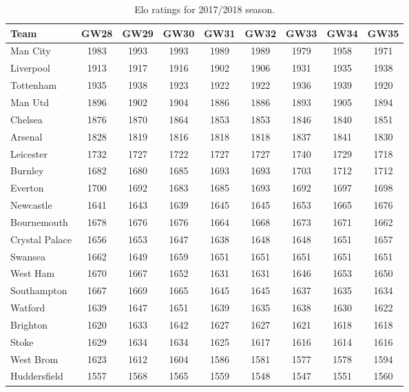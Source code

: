 \begin{table}[H]
\centering
\smaller
\begin{tabular}{|l|c|c|c|c|c|c|c|c|}
\hline
Team           & GW28 & GW29 & GW30 & GW31 & GW32 & GW33 & GW34 & GW35 \\
\hline
Man City       & 1983 & 1993 & 1993 & 1989 & 1989 & 1979 & 1958 & 1971 \\
Liverpool      & 1913 & 1917 & 1916 & 1902 & 1906 & 1931 & 1935 & 1938 \\
Tottenham      & 1935 & 1938 & 1923 & 1922 & 1922 & 1936 & 1939 & 1920 \\
Man Utd        & 1896 & 1902 & 1904 & 1886 & 1886 & 1893 & 1905 & 1894 \\
Chelsea        & 1876 & 1870 & 1864 & 1853 & 1853 & 1846 & 1840 & 1851 \\
Arsenal        & 1828 & 1819 & 1816 & 1818 & 1818 & 1837 & 1841 & 1830 \\
Leicester      & 1732 & 1727 & 1722 & 1727 & 1727 & 1740 & 1729 & 1718 \\
Burnley        & 1682 & 1680 & 1685 & 1693 & 1693 & 1703 & 1712 & 1712 \\
Everton        & 1700 & 1692 & 1683 & 1685 & 1693 & 1692 & 1697 & 1698 \\
Newcastle      & 1641 & 1643 & 1639 & 1645 & 1645 & 1653 & 1665 & 1676 \\
Bournemouth    & 1678 & 1676 & 1676 & 1664 & 1668 & 1673 & 1671 & 1662 \\
Crystal Palace & 1656 & 1653 & 1647 & 1638 & 1648 & 1648 & 1651 & 1657 \\
Swansea        & 1662 & 1649 & 1659 & 1651 & 1651 & 1651 & 1651 & 1651 \\
West Ham       & 1670 & 1667 & 1652 & 1631 & 1631 & 1646 & 1653 & 1650 \\
Southampton    & 1667 & 1669 & 1665 & 1645 & 1645 & 1637 & 1635 & 1634 \\
Watford        & 1639 & 1647 & 1651 & 1639 & 1635 & 1638 & 1630 & 1622 \\
Brighton       & 1620 & 1633 & 1642 & 1627 & 1627 & 1621 & 1618 & 1618 \\
Stoke          & 1629 & 1634 & 1634 & 1625 & 1617 & 1616 & 1614 & 1616 \\
West Brom      & 1623 & 1612 & 1604 & 1586 & 1581 & 1577 & 1578 & 1594 \\
Huddersfield   & 1557 & 1568 & 1565 & 1559 & 1548 & 1547 & 1551 & 1560 \\
\hline
\end{tabular}
\caption{Elo ratings for 2017/2018 season.}
\label{tab:elo_values_gameweeks_4}
\end{table}
